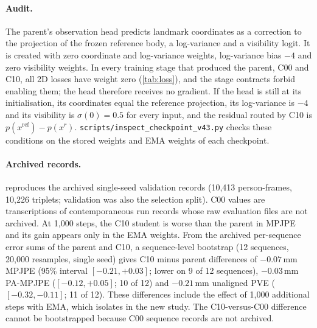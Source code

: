 \documentclass[10pt,onecolumn,letterpaper]{article}
\begin{document}
\paragraph{Audit.}
The parent's observation head predicts landmark coordinates as a correction to the projection of the frozen reference body, a log-variance and a visibility logit.
It is created with zero coordinate and log-variance weights, log-variance bias $-4$ and zero visibility weights.
In every training stage that produced the parent, C00 and C10, all 2D losses have weight zero (\cref{tab:loss}), and the stage contracts forbid enabling them; the head therefore receives no gradient.
If the head is still at its initialisation, its coordinates equal the reference projection, its log-variance is $-4$ and its visibility is $\sigma(0)=0.5$ for every input, and the residual routed by C10 is $p(x^{\text{ref}})-p(x^r)$.
\texttt{scripts/inspect\_checkpoint\_v43.py} checks these conditions on the stored weights and EMA weights of each checkpoint.

\paragraph{Archived records.}
 reproduces the archived single-seed validation records (10,413 person-frames, 10,226 triplets; validation was also the selection split).
C00 values are transcriptions of contemporaneous run records whose raw evaluation files are not archived.
At 1,000 steps, the C10 student is worse than the parent in MPJPE and its gain appears only in the EMA weights.
From the archived per-sequence error sums of the parent and C10, a sequence-level bootstrap (12 sequences, 20,000 resamples, single seed) gives C10 minus parent differences of $-0.07$\,mm MPJPE (95\% interval $[-0.21,+0.03]$; lower on 9 of 12 sequences), $-0.03$\,mm PA-MPJPE ($[-0.12,+0.05]$; 10 of 12) and $-0.21$\,mm unaligned PVE ($[-0.32,-0.11]$; 11 of 12).
These differences include the effect of 1,000 additional steps with EMA, which  isolates in the new study.
The C10-versus-C00 difference cannot be bootstrapped because C00 sequence records are not archived.
\end{document}
